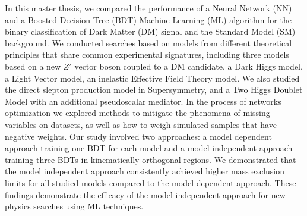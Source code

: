 \documentclass[12pt, a4paper]{book}
\begin{document}
In this master thesis, we compared the performance of a Neural Network (NN) and a Boosted Decision Tree (BDT) Machine Learning (ML) algorithm for the binary classification of Dark Matter (DM) signal and the Standard Model (SM) background. We conducted searches based on models from different theoretical principles that share common experimental signatures, 
including three models based on a new $Z'$ vector boson coupled to a DM candidate, a Dark Higgs model, a Light Vector model, an inelastic Effective Field Theory model. We also studied the direct slepton production model in Supersymmetry, and a Two Higgs Doublet Model with an additional pseudoscalar mediator. 
In the process of networks optimization we explored methods to mitigate the phenomena of missing variables on datasets, as well as how to weigh simulated samples that have negative weights. Our study involved two approaches: a model dependent 
approach training one BDT for each model and a model independent approach training three BDTs in kinematically orthogonal regions. We demonstrated that the model independent approach consistently achieved higher mass exclusion limits for all studied models compared to the model dependent approach. 
These findings demonstrate the efficacy of the model independent approach for new physics searches using ML techniques.
\end{document}
